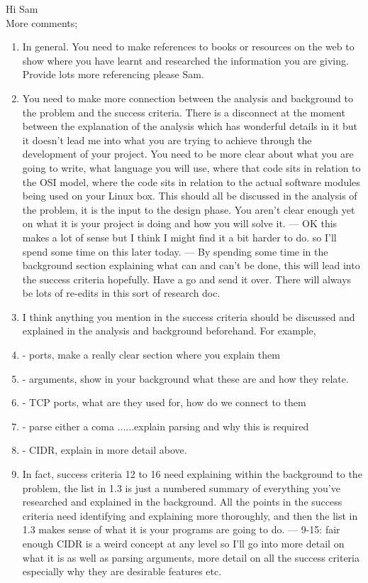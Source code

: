 \documentclass{article}
\begin{document}
Hi Sam \\

More comments;
\begin{enumerate}
  \item{In general. You need to make references to books or resources on the web to show where you have learnt and researched the information you are giving. Provide lots more referencing please Sam. }
  \item{You need to make more connection between the analysis and background to the problem and the success criteria. There is a disconnect at the moment between the explanation of the analysis which has wonderful details in it but it doesn’t lead me into what you are trying to achieve through the development of your project. You need to be more clear about what you are going to write, what language you will use, where that code sits in relation to the OSI model, where the code sits in relation to the actual software modules being used on your Linux box. This should all be discussed in the analysis of the problem, it is the input to the design phase. You aren’t clear enough yet on what it is your project is doing and how you will solve it. --- OK this makes a lot of sense but I think I might find it a bit harder to do. so I'll spend some time on this later today. --- By spending some time in the background section explaining what can and can’t be done, this will lead into the success criteria hopefully. Have a go and send it over. There will always be lots of re-edits in this sort of research doc. }
  \item{I think anything you mention in the success criteria should be discussed and explained in the analysis and background beforehand. For example, }
  \item{- ports, make a really clear section where you explain them }
  \item{- arguments, show in your background what these are and how they relate. }
  \item{- TCP ports, what are they used for, how do we connect to them}
  \item{- parse either a coma ......explain parsing and why this is required}
  \item{- CIDR, explain in more detail above. }
  \item{In fact, success criteria 12 to 16 need explaining within the background to the problem, the list in 1.3 is just a numbered summary of everything you’ve researched and explained in the background. All the points in the success criteria need identifying and explaining more thoroughly, and then the list in 1.3 makes sense of what it is your programs are going to do. --- 9-15: fair enough CIDR is a weird concept at any level so I'll go into more detail on what it is as well as parsing arguments, more detail on all the success criteria especially why they are desirable features etc.}

\end{enumerate}
\end{document}
